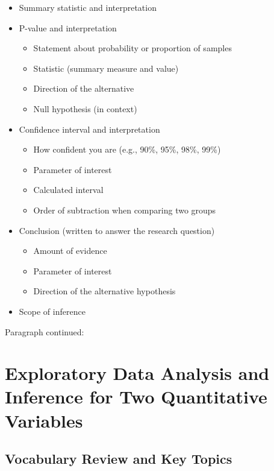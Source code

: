 \documentclass[
]{report}
\begin{document}
\begin{itemize}
\item
  Summary statistic and interpretation
\item
  P-value and interpretation

  \begin{itemize}
  \item
    Statement about probability or proportion of samples
  \item
    Statistic (summary measure and value)
  \item
    Direction of the alternative
  \item
    Null hypothesis (in context)
  \end{itemize}
\item
  Confidence interval and interpretation

  \begin{itemize}
  \item
    How confident you are (e.g., 90\%, 95\%, 98\%, 99\%)
  \item
    Parameter of interest
  \item
    Calculated interval
  \item
    Order of subtraction when comparing two groups
  \end{itemize}
\item
  Conclusion (written to answer the research question)

  \begin{itemize}
  \item
    Amount of evidence
  \item
    Parameter of interest
  \item
    Direction of the alternative hypothesis
  \end{itemize}
\item
  Scope of inference
\end{itemize}

\newpage

Paragraph continued:

\newpage

\chapter{Exploratory Data Analysis and Inference for Two Quantitative Variables}\label{exploratory-data-analysis-and-inference-for-two-quantitative-variables}

\section{Vocabulary Review and Key Topics}\label{vocabulary-review-and-key-topics-10}
\end{document}
